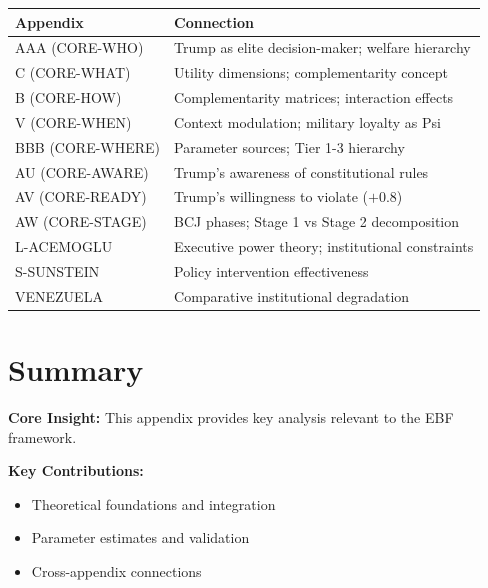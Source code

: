 \begin{table}[h]
\centering
\begin{tabular}{|l|l|}
\hline
\textbf{Appendix} & \textbf{Connection} \\
\hline
AAA (CORE-WHO) & Trump as elite decision-maker; welfare hierarchy \\
C (CORE-WHAT) & Utility dimensions; complementarity concept \\
B (CORE-HOW) & Complementarity matrices; interaction effects \\
V (CORE-WHEN) & Context modulation; military loyalty as Psi \\
BBB (CORE-WHERE) & Parameter sources; Tier 1-3 hierarchy \\
AU (CORE-AWARE) & Trump's awareness of constitutional rules \\
AV (CORE-READY) & Trump's willingness to violate ($+0.8$) \\
AW (CORE-STAGE) & BCJ phases; Stage 1 vs Stage 2 decomposition \\
\hline
L-ACEMOGLU & Executive power theory; institutional constraints \\
S-SUNSTEIN & Policy intervention effectiveness \\
VENEZUELA & Comparative institutional degradation \\
\hline
\end{tabular}
\end{table}




\section{Summary}
\label{sec:mts-summary}

\begin{tcolorbox}[colback=gray!5!white, colframe=gray!75!black,
    title=Appendix mts Summary]

\textbf{Core Insight:}
This appendix provides key analysis relevant to the EBF framework.

\textbf{Key Contributions:}
\begin{itemize}[nosep]
    \item Theoretical foundations and integration
    \item Parameter estimates and validation
    \item Cross-appendix connections
\end{itemize}

\end{tcolorbox}


